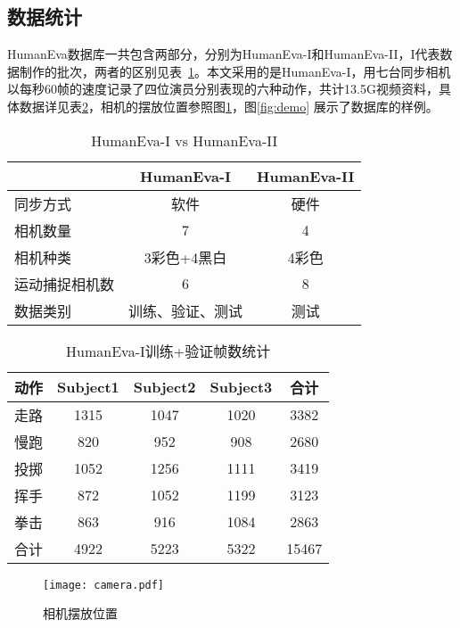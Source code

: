 \subsection{数据统计}
HumanEva数据库一共包含两部分，分别为HumanEva-I和HumanEva-II，I代表数据制作的批次，两者的区别见表~\ref{tab:I-II}。本文采用的是HumanEva-I，用七台同步相机以每秒60帧的速度记录了四位演员分别表现的六种动作，共计13.5G视频资料，具体数据详见表\ref{tab:totalframes}，相机的摆放位置参照图\ref{fig:camera}，图\ref{fig:demo} 展示了数据库的样例。
\begin{table}[htbp]
  \centering
  \caption{HumanEva-I vs HumanEva-II}
  \label{tab:I-II}
    \begin{tabular}{lcc}
      \toprule[1.5pt]
       & HumanEva-I & HumanEva-II \\\midrule[1pt]
      同步方式 & 软件 & 硬件\\
      相机数量 & 7 & 4\\
      相机种类 & 3彩色+4黑白 & 4彩色\\
      运动捕捉相机数 & 6 & 8\\
      数据类别 & 训练、验证、测试 & 测试\\
      \bottomrule[1.5pt]
    \end{tabular}
\end{table}

\begin{table}[htbp]
  \centering
  \caption{HumanEva-I训练+验证帧数统计}
  \label{tab:totalframes}
    \begin{tabular}{lcccc}
      \toprule[1.5pt]
      动作 & Subject1 & Subject2 & Subject3 & 合计 \\\midrule[1pt]
      走路 & 1315 & 1047 & 1020 & 3382 \\
      慢跑 & 820 & 952 & 908 & 2680 \\
      投掷 & 1052 & 1256 & 1111 & 3419 \\
      挥手 & 872 & 1052 & 1199 & 3123 \\
      拳击 & 863 & 916 & 1084 & 2863 \\
      合计 & 4922 & 5223 & 5322 & 15467\\
      \bottomrule[1.5pt]
    \end{tabular}
\end{table}

\begin{figure}[htbp]
  \centering
  \texttt{[image: camera.pdf]}\\
  \caption{相机摆放位置}\label{fig:camera}
\end{figure}

